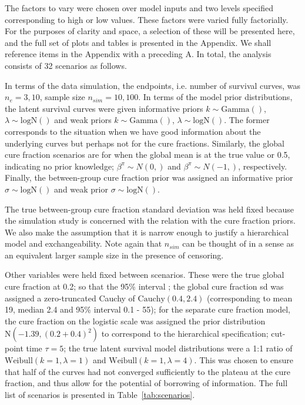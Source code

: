 \documentclass[AMA,STIX1COL]{WileyNJD-v2}
\begin{document}
The factors to vary were chosen over model inputs and two levels specified corresponding to high or low values. These factors were varied fully factorially. For the purposes of clarity and space, a selection of these will be presented here, and the full set of plots and tables is presented in the Appendix. We shall reference items in the Appendix with a preceding A. In total, the analysis consists of 32 scenarios as follows.

In terms of the data simulation, the endpoints, i.e. number of survival curves, was $n_e = {3,10}$, sample size $n_{sim} = {10,100}$. In terms of the model prior distributions, the latent survival curves were given informative priors $k \sim \text{Gamma}( )$, $\lambda \sim \text{logN}( )$ and weak priors $k \sim \text{Gamma}( )$, $\lambda \sim \text{logN}( )$. The former corresponds to the situation when we have good information about the underlying curves but perhaps not for the cure fractions.
Similarly, the global cure fraction scenarios are for when the global mean is at the true value or 0.5, indicating no prior knowledge; $\beta^{\pi} \sim N(0, )$ and $\beta^{\pi} \sim N(-1, )$, respectively. Finally, the between-group cure fraction prior was assigned an informative prior $\sigma \sim \text{logN}()$ and weak prior $\sigma \sim \text{logN}()$.

The true between-group cure fraction standard deviation was held fixed because the simulation study is concerned with the relation with the cure fraction priors. We also make the assumption that it is narrow enough to justify a hierarchical model and exchangeability. Note again that $n_{sim}$ can be thought of in a sense as an equivalent larger sample size in the presence of censoring.

Other variables were held fixed between scenarios. These were the true global cure fraction at 0.2; 
so that the 95\% interval ;
the global cure fraction sd was assigned a zero-truncated Cauchy of $\text{Cauchy}(0.4, 2.4)$ (corresponding to mean 19, median 2.4 and 95\% interval 0.1 - 55);
for the separate cure fraction model, the cure fraction on the logistic scale was assigned the prior distribution $\text{N}(-1.39, (0.2 + 0.4)^2)$ to correspond to the hierarchical specification;
cut-point time $\tau = {5}$; the true latent survival model distributions were a 1:1 ratio of $\text{Weibull}(k=1, \lambda=1)$ and $\text{Weibull}(k=1, \lambda=4)$. This was chosen to ensure that half of the curves had not converged sufficiently to the plateau at the cure fraction, and thus allow for the potential of borrowing of information. The full list of scenarios is presented in Table~\ref{tab:scenarios}.
\end{document}
